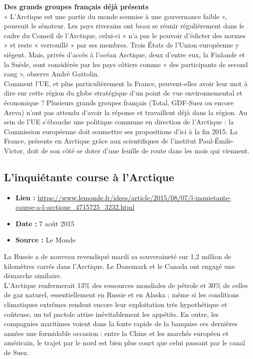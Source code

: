 \documentclass[8pt]{article}
\begin{document}
\textbf{Des grands groupes français déjà présents}\\

« L’Arctique est une partie du monde soumise à une gouvernance faible », poursuit le sénateur. Les pays riverains ont beau se réunir régulièrement dans le cadre du Conseil de l’Arctique, celui-ci « n’a pas le pouvoir d’édicter des normes » et reste « verrouillé » par ses membres. Trois États de l’Union européenne y siègent. Mais, privés d’accès à l’océan Arctique, deux d’entre eux, la Finlande et la Suède, sont considérés par les pays côtiers comme « des participants de second rang », observe André Gattolin.\\

Comment l’UE, et plus particulièrement la France, peuvent-elles avoir leur mot à dire sur cette région du globe stratégique d’un point de vue environnemental et économique ? Plusieurs grands groupes français (Total, GDF-Suez ou encore Areva) n’ont pas attendu d’avoir la réponse et travaillent déjà dans la région. Au sein de l’UE s’ébauche une politique commune en direction de l’Arctique : la Commission européenne doit soumettre ses propositions d’ici à la fin 2015. La France, présente en Arctique grâce aux scientifiques de l’institut Paul-Émile-Victor, doit de son côté se doter d’une feuille de route dans les mois qui viennent.

\newpage

\subsection{L’inquiétante course à l’Arctique}
\begin{itemize}
	\item \textbf{Lien : }  \url{https://www.lemonde.fr/idees/article/2015/08/07/l-inquietante-course-a-l-arctique_4715725_3232.html}
	\item \textbf{Date : } 7 août 2015
	\item \textbf{Source : } Le Monde
\end{itemize}

La Russie a de nouveau revendiqué mardi sa souveraineté sur 1,2 million de kilomètres carrés dans l’Arctique. Le Danemark et le Canada ont engagé une démarche similaire.\\

L’Arctique renfermerait 13\% des ressources mondiales de pétrole et 30\% de celles de gaz naturel, essentiellement en Russie et en Alaska ; même si les conditions climatiques extrêmes rendent encore leur exploitation très hypothétique et coûteuse, un tel pactole attise inévitablement les appétits. En outre, les compagnies maritimes voient dans la fonte rapide de la banquise ces dernières années une formidable occasion : entre la Chine et les marchés européen et américain, le trajet par le nord est bien plus court que celui passant par le canal de Suez.\\
\end{document}
